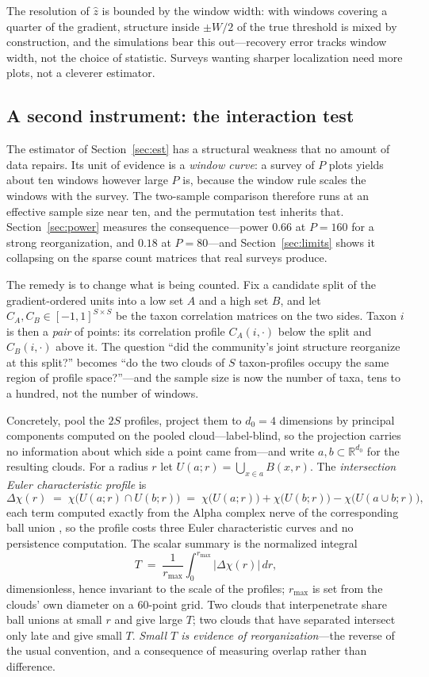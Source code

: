 \documentclass[review,12pt,authoryear]{elsarticle}
\theoremstyle{remark}
\begin{document}
The resolution of $\hat z$ is bounded by the window width: with windows
covering a quarter of the gradient, structure inside $\pm W/2$ of the true
threshold is mixed by construction, and the simulations bear this out---recovery error tracks window width, not the choice of statistic. Surveys
wanting sharper localization need more plots, not a cleverer estimator.

\subsection{A second instrument: the interaction test}
\label{sec:mixup}

The estimator of Section~\ref{sec:est} has a structural weakness that no
amount of data repairs. Its unit of evidence is a \emph{window curve}: a
survey of $P$ plots yields about ten windows however large $P$ is, because
the window rule scales the windows with the survey. The two-sample
comparison therefore runs at an effective sample size near ten, and the
permutation test inherits that. Section~\ref{sec:power} measures the
consequence---power $0.66$ at $P = 160$ for a strong reorganization, and
$0.18$ at $P = 80$---and
Section~\ref{sec:limits} shows it collapsing on the sparse count matrices
that real surveys produce.

The remedy is to change what is being counted. Fix a candidate split of the
gradient-ordered units into a low set $A$ and a high set $B$, and let
$C_A, C_B \in [-1,1]^{S \times S}$ be the taxon correlation matrices on the
two sides. Taxon $i$ is then a \emph{pair} of points: its correlation
profile $C_A(i,\cdot)$ below the split and $C_B(i,\cdot)$ above it. The
question ``did the community's joint structure reorganize at this split?''
becomes ``do the two clouds of $S$ taxon-profiles occupy the same region of
profile space?''---and the sample size is now the number of taxa, tens to a
hundred, not the number of windows.

Concretely, pool the $2S$ profiles, project them to $d_0 = 4$ dimensions by
principal components computed on the pooled cloud---label-blind, so the
projection carries no information about which side a point came from---and
write $a, b \subset \mathbb{R}^{d_0}$ for the resulting clouds. For a radius
$r$ let $U(a;r) = \bigcup_{x \in a} B(x,r)$. The \emph{intersection Euler
characteristic profile} is
\[
  \Delta\chi(r) \;=\; \chi\bigl(U(a;r) \cap U(b;r)\bigr)
  \;=\; \chi\bigl(U(a;r)\bigr) + \chi\bigl(U(b;r)\bigr)
      - \chi\bigl(U(a \cup b;r)\bigr),
\]
each term computed exactly from the Alpha complex nerve of the corresponding
ball union \citep{maria2014gudhi}, so the profile costs three Euler
characteristic curves and no persistence computation. The scalar summary is
the normalized integral
\[
  T \;=\; \frac{1}{r_{\max}} \int_0^{r_{\max}} \bigl|\Delta\chi(r)\bigr|\,dr ,
\]
dimensionless, hence invariant to the scale of the profiles; $r_{\max}$ is
set from the clouds' own diameter on a 60-point grid. Two clouds that
interpenetrate share ball unions at small $r$ and give large $T$; two clouds
that have separated intersect only late and give small $T$. \emph{Small $T$
is evidence of reorganization}---the reverse of the usual convention, and a
consequence of measuring overlap rather than difference.
\end{document}
